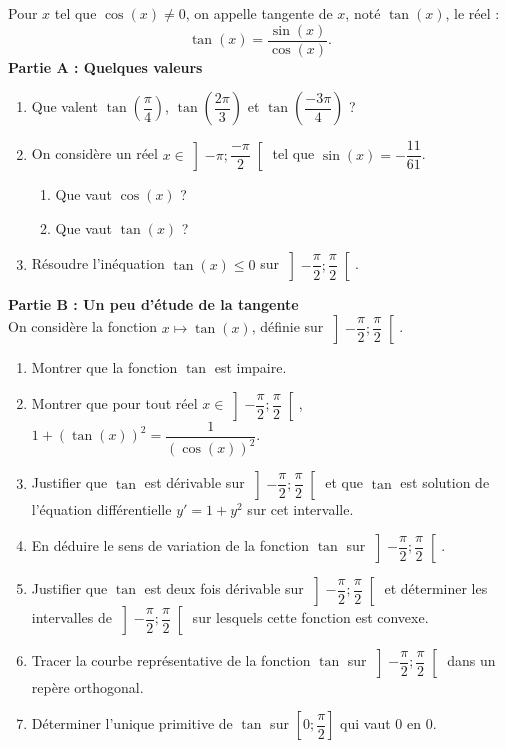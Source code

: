 \documentclass[11pt,fleqn, openany]{book} %
\begin{document}
\begin{exercise}[subtitle={(Fonction tangente)}]Pour $x$ tel que $\cos(x)\neq 0$, on appelle tangente de $x$, noté $\tan (x)$, le réel :
\[ \tan (x) = \dfrac{\sin (x)}{\cos (x)}.\]
\textbf{Partie A : Quelques valeurs}
\begin{enumerate}
\item Que valent $\tan \left( \dfrac{\pi}{4} \right)$, $\tan \left( \dfrac{2\pi}{3} \right)$ et $\tan \left( \dfrac{-3\pi}{4} \right)$ ?
\item On considère un réel $x \in \left] -\pi ; \dfrac{-\pi}{2} \right[$ tel que $\sin (x) = -\dfrac{11}{61}$.
\begin{enumerate}
\item Que vaut $\cos (x)$ ?
\item Que vaut $\tan (x)$ ?
\end{enumerate}
\item Résoudre l'inéquation $\tan(x) \leqslant 0$ sur $\left]-\dfrac{\pi}{2};\dfrac{\pi}{2}\right[$.
\end{enumerate}
\textbf{Partie B : Un peu d'étude de la tangente}\\
On considère la fonction $x\mapsto \tan (x)$, définie sur $\left]-\dfrac{\pi}{2};\dfrac{\pi}{2}\right[$.
\begin{enumerate}
\item Montrer que la fonction $\tan$ est impaire.
\item Montrer que pour tout réel $x\in\left]-\dfrac{\pi}{2};\dfrac{\pi}{2}\right[$, $1+(\tan(x))^2=\dfrac{1}{(\cos(x))^2}$.
\item Justifier que $\tan$ est dérivable sur $\left]-\dfrac{\pi}{2};\dfrac{\pi}{2}\right[$ et que $\tan$ est solution de l'équation différentielle $y'=1+y^2$ sur cet intervalle.
\item En déduire le sens de variation de la fonction $\tan$ sur $\left]-\dfrac{\pi}{2};\dfrac{\pi}{2}\right[$.
\item Justifier que $\tan$ est deux fois dérivable sur $\left]-\dfrac{\pi}{2};\dfrac{\pi}{2}\right[$ et déterminer les intervalles de $\left]-\dfrac{\pi}{2};\dfrac{\pi}{2}\right[$ sur lesquels cette fonction est convexe.
\item Tracer la courbe représentative de la fonction $\tan$ sur $\left]-\dfrac{\pi}{2};\dfrac{\pi}{2}\right[$ dans un repère orthogonal.
\item Déterminer l'unique primitive de $\tan$ sur $\left[0;\dfrac{\pi}{2}\right]$ qui vaut 0 en 0.
\end{enumerate}
\end{exercise}
\end{document}

